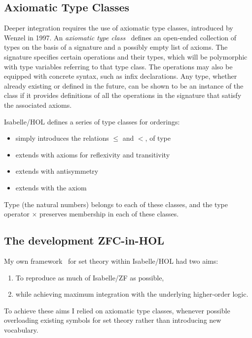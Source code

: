 \documentclass[runningheads]{llncs}
\begin{document}
\subsection{Axiomatic Type Classes}

Deeper integration requires the use of axiomatic type classes, introduced by Wenzel in 1997.
An \textit{axiomatic type class}~\cite{wenzel-type} defines an open-ended collection of types on the basis of a signature and a possibly empty list of axioms. The signature specifies certain operations and their types, which will be polymorphic with type variables referring to that type class.
The operations may also be equipped with concrete syntax, such as infix declarations.
Any type, whether already existing or defined in the future, can be shown to be an instance of the class if it provides definitions of all the operations in the signature that satisfy the associated axioms.

Isabelle/HOL defines a series of type classes for orderings:
\begin{itemize}
	\item {} simply introduces the relations $\le$ and $<$, of type 
	\item {} extends  with axioms for reflexivity and transitivity
	\item {} extends  with antisymmetry
	\item {} extends  with the axiom 
\end{itemize}
Type  (the natural numbers) belongs to each of these classes, and the type operator $\times$ preserves membership in each of these classes.

\subsection{The development ZFC-in-HOL}

My own framework~\cite{ZFC_in_HOL-AFP} for set theory within Isabelle/HOL had two aims:
\begin{enumerate}
	\item To reproduce as much of Isabelle/ZF as possible,
	\item while achieving maximum integration with the underlying higher-order logic.
\end{enumerate}
To achieve these aims I relied on axiomatic type classes, whenever possible overloading existing symbols for set theory rather than introducing new vocabulary.
\end{document}
